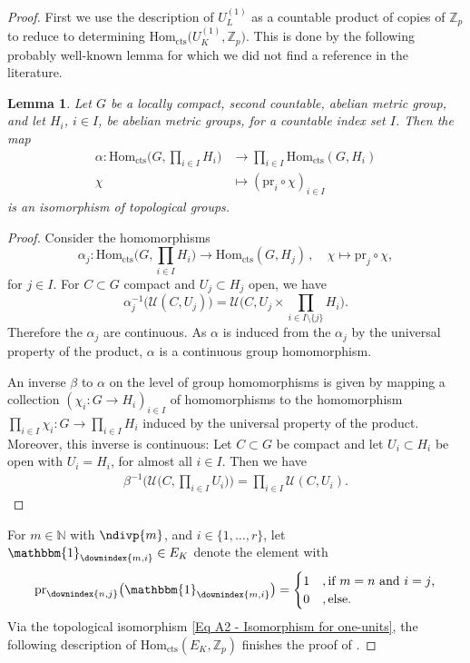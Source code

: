 \documentclass[a4paper, reqno, 10pt]{amsart}
\newtheorem{lemma}[theorem]{Lemma}
\theoremstyle{definition}
\numberwithin{equation}{section}
\newcommand{\cont}{{\mathrm{cts}}}
\newcommand{\Hom}{{\mathrm{Hom}}}
\newcommand{\lra}{\longrightarrow}
\newcommand{\lto}{\longmapsto}
\newcommand{\pr}{{\mathrm{pr}}}
\newcommand{\ra}{\rightarrow}
\newcommand{\BN}{{\mathbb {N}}}
\newcommand{\BZ}{{\mathbb {Z}}}
\newcommand{\CU}{{\mathcal {U}}}
\begin{document}
\begin{proof}
	First we use the description of $U_L^{(1)}$ as a countable product of copies of $\BZ_p$ to reduce to determining $\Hom_\cont \big(U_K^{(1)}, \BZ_p \big)$.
	This is done by the following probably well-known lemma for which we did not find a reference in the literature.
	
	
	\begin{lemma}\label{Lemma A2 - Hom to product}
		Let $G$ be a locally compact, second countable, abelian metric group, and let $H_i$, $i\in I$, be abelian metric groups, for a countable index set $I$.
		Then the map
		\begin{align*}
			\alpha \colon \Hom_\cont \bigg( G, \prod_{i\in I} H_i \bigg) &\lra \prod_{i\in I} \Hom_\cont (G, H_i) \\
			\chi &\lto (\pr_i \circ \chi)_{i\in I}
		\end{align*}
		is an isomorphism of topological groups.
	\end{lemma}
	\begin{proof}
		Consider the homomorphisms
		\[\alpha_j \colon \Hom_\cont \bigg( G, \prod_{i\in I} H_i \bigg) \lra \Hom_\cont (G, H_j) \,,\quad \chi \lto \pr_j \circ \chi ,\]
		for $j \in I$.
		For $C \subset G$ compact and $U_j\subset H_j$ open, we have 
		\begin{equation*} 
			\alpha_j^{-1} \big( \CU(C,U_j) \big) = \CU\bigg(C, U_j \times \prod_{i \in I\setminus\{j\}}H_i \bigg) . 
		\end{equation*}
		Therefore the $\alpha_j$ are continuous.
		As $\alpha$ is induced from the $\alpha_j$ by the universal property of the product, $\alpha$ is a continuous group homomorphism.
		
		
		An inverse $\beta$ to $\alpha$ on the level of group homomorphisms is given by mapping a collection $(\chi_i \colon G \ra H_i)_{i\in I}$ of homomorphisms to the homomorphism $\prod_{i\in I} \chi_i \colon G \ra \prod_{i\in I} H_i $ induced by the universal property of the product.
		Moreover, this inverse is continuous:
		Let $C \subset G$ be compact and let $U_i \subset H_i$ be open with $U_i = H_i$, for almost all $i \in I$.
		Then we have
		\begin{align*}
			\beta^{-1} \Bigg( \CU\bigg( C, \prod_{i\in I} U_i \bigg) \Bigg) = \prod_{i\in I} \CU(C, U_i) .
		\end{align*}
	\end{proof}
	
	
	For $m\in \BN$ with $\ndivp{m}$, and $i\in \{1,\ldots,r\}$, let $\mathbbm{1}_\downindex{m,i} \in E_K$ denote the element with
	\begin{equation*}
		\pr_\downindex{n,j} \big(\mathbbm{1}_\downindex{{m,i}} \big) = \begin{cases}	1&, \text{if $m=n$ and $i=j$,} \\
			0	&, \text{else.}					\end{cases}
	\end{equation*}
	Via the topological isomorphism \eqref{Eq A2 - Isomorphism for one-units}, the following description of $ \Hom_\cont (E_K, \BZ_p)$ finishes the proof of .
	

\end{proof}
\end{document}
